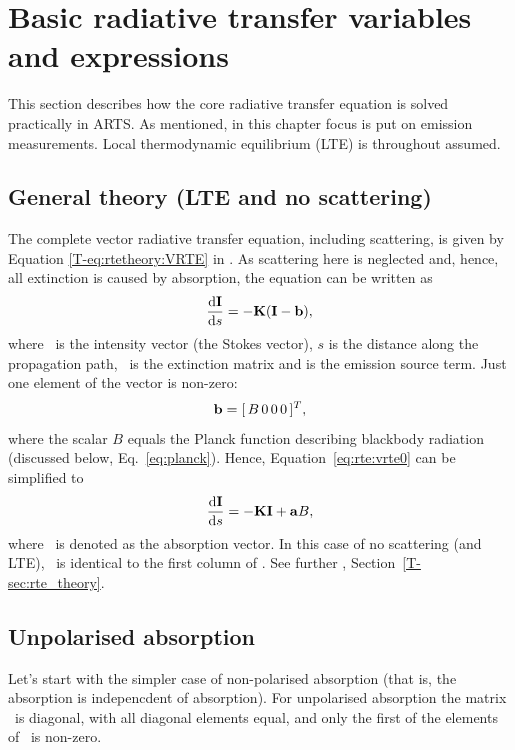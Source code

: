 \section{Basic radiative transfer variables and expressions}
\label{sec:fm_defs:rte}

This section describes how the core radiative transfer equation is solved
practically in ARTS. As mentioned, in this chapter focus is put on emission
measurements. Local thermodynamic equilibrium (LTE) is throughout assumed.

\subsection{General theory (LTE and no scattering)}

The complete vector radiative transfer equation, including scattering, is given
by Equation \ref{T-eq:rtetheory:VRTE} in \theory. As scattering here is
neglected and, hence, all extinction is caused by absorption, the equation can
be written as
\begin{equation}
  \label{eq:rte:vrte0}
  \frac {\mathrm{d}{\bf I}}{\mathrm{d} s} = -{\bf K}({\bf I}-\mathbf{b}),
\end{equation}
where \StoVec\ is the intensity vector (the Stokes vector), $s$ is the distance
along the propagation path, \ExtMat\ is the extinction matrix and  is
the emission source term. Just one element of the vector  is non-zero:
\begin{equation}
  \label{eq:rte:bvec}
  \mathbf{b} = [\,B\,0\,0\,0\,]^T,
\end{equation}
where the scalar $B$ equals the Planck function describing blackbody radiation
(discussed below, Eq.~\ref{eq:planck}).
Hence, Equation~\ref{eq:rte:vrte0} can be simplified to
\begin{equation}
  \label{eq:rte:vrte}
  \frac {\mathrm{d}{\bf I}}{\mathrm{d} s} = -{\bf K}{\bf I} + {\bf a} B,
\end{equation}
where \AbsVec\ is denoted as the absorption vector. In this case of no
scattering (and LTE), \AbsVec\ is identical to the first column of \ExtMat.
See further \theory, Section~\ref{T-sec:rte_theory}. 


\subsection{Unpolarised absorption}

Let's start with the simpler case of non-polarised absorption (that is, the
absorption is indepencdent of absorption). For unpolarised absorption the
matrix \ExtMat\ is diagonal, with all diagonal elements equal, and only the
first of the elements of \AbsVec\ is non-zero.

